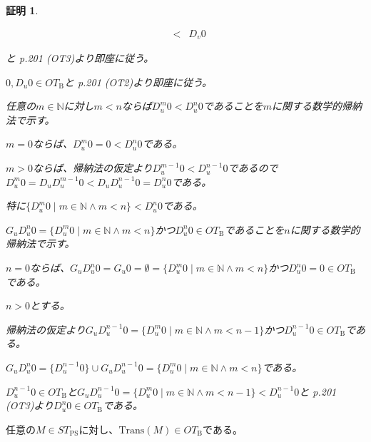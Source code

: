 \documentclass[dvipdfmx,uplatex]{jsarticle}
\theoremstyle{customnonumberbreakfortheorem}
\theoremstyle{customnonumberbreakforproof}
\newtheorem{hideableproof}{証明}
\begin{document}
\begin{hideableproof}
\begin{penumerate}
\begin{eqnarray*}
		& < & D_v 0
		\end{eqnarray*}
		\item[] と\cite{buc1} p.201 (OT3)より即座に従う。
		\item \(0, D_u 0 \in OT_{\textrm{B}}\)と\cite{buc1} p.201 (OT2)より即座に従う。
		\item[]
		\item 任意の\(m \in \mathbb{N}\)に対し\(m < n\)ならば\(D_u^m 0 < D_u^n 0\)であることを\(m\)に関する数学的帰納法で示す。
		\item[] \(m = 0\)ならば、\(D_u^m 0 = 0 < D_u^n 0\)である。
		\item[] \(m > 0\)ならば、帰納法の仮定より\(D_u^{m-1} 0 < D_u^{n-1} 0\)であるので\(D_u^m 0 = D_u D_u^{m-1} 0 < D_u D_u^{n-1} 0 = D_u^n 0\)である。
		\item[] 特に\(\{D_u^m 0 \mid m \in \mathbb{N} \wedge m < n\} < D_u^n 0\)である。
		\item[]
		\item[] \(G_u D_u^n 0 = \{D_u^m 0 \mid m \in \mathbb{N} \wedge m < n\}\)かつ\(D_u^n 0 \in OT_{\textrm{B}}\)であることを\(n\)に関する数学的帰納法で示す。
		\item[] \(n = 0\)ならば、\(G_u D_u^n 0 = G_u 0 = \emptyset = \{D_u^m 0 \mid m \in \mathbb{N} \wedge m < n\}\)かつ\(D_u^n 0 = 0 \in OT_{\textrm{B}}\)である。
		\item[] \(n > 0\)とする。
		\begin{indented}
			\item 帰納法の仮定より\(G_u D_u^{n-1} 0 = \{D_u^m 0 \mid m \in \mathbb{N} \wedge m < n-1\}\)かつ\(D_u^{n-1} 0 \in OT_{\textrm{B}}\)である。
			\item \(G_u D_u^n 0 = \{D_u^{n-1} 0\} \cup G_u D_u^{n-1} 0 = \{D_u^m 0 \mid m \in \mathbb{N} \wedge m < n\}\)である。
			\item \(D_u^{n-1} 0 \in OT_{\textrm{B}}\)と\(G_u D_u^{n-1} 0 = \{D_u^m 0 \mid m \in \mathbb{N} \wedge m < n-1\} < D_u^{n-1} 0\)と\cite{buc1} p.201 (OT3)より\(D_u^n 0 \in OT_{\textrm{B}}\)である。
		\end{indented}
	\end{penumerate}
\end{hideableproof}

\begin{lemma}\label{Transが標準形を保つこと}
	任意の\(M \in ST_{\textrm{PS}}\)に対し、\(\textrm{Trans}(M) \in OT_{\textrm{B}}\)である。
\end{lemma}
\end{document}
